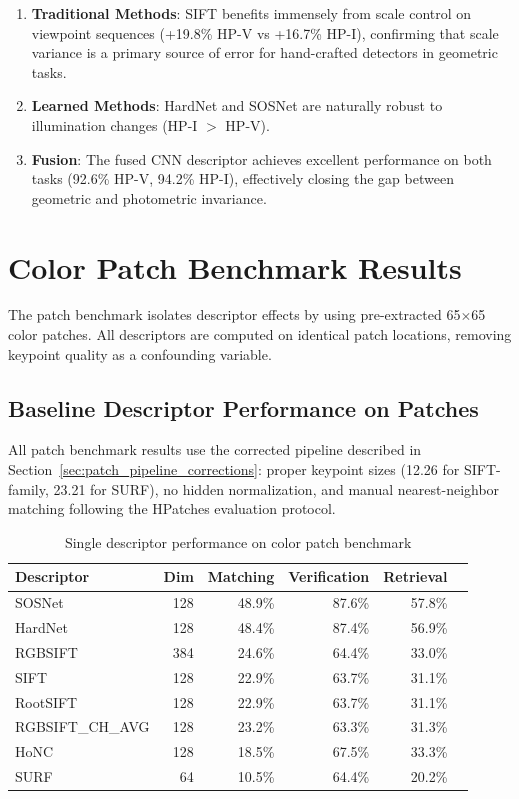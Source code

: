 \begin{enumerate}
    \item \textbf{Traditional Methods}: SIFT benefits immensely from scale control on viewpoint sequences (+19.8\% HP-V vs +16.7\% HP-I), confirming that scale variance is a primary source of error for hand-crafted detectors in geometric tasks.
    \item \textbf{Learned Methods}: HardNet and SOSNet are naturally robust to illumination changes (HP-I $>$ HP-V).
    \item \textbf{Fusion}: The fused CNN descriptor achieves excellent performance on both tasks (92.6\% HP-V, 94.2\% HP-I), effectively closing the gap between geometric and photometric invariance.
\end{enumerate}

\section{Color Patch Benchmark Results}%
\label{sec:patch_results}

The patch benchmark isolates descriptor effects by using pre-extracted 65$\times$65 color patches. All descriptors are computed on identical patch locations, removing keypoint quality as a confounding variable.

\subsection{Baseline Descriptor Performance on Patches}

All patch benchmark results use the corrected pipeline described in Section~\ref{sec:patch_pipeline_corrections}: proper keypoint sizes (12.26 for SIFT-family, 23.21 for SURF), no hidden normalization, and manual nearest-neighbor matching following the HPatches evaluation protocol.

\begin{table}[ht]
\centering
\caption{Single descriptor performance on color patch benchmark}%
\label{tab:patch_baselines}
\begin{tabular}{lrrrrr}
\toprule
\textbf{Descriptor} & \textbf{Dim} & \textbf{Matching} & \textbf{Verification} & \textbf{Retrieval} \\
\midrule
SOSNet & 128 & 48.9\% & 87.6\% & 57.8\% \\
HardNet & 128 & 48.4\% & 87.4\% & 56.9\% \\
RGBSIFT & 384 & 24.6\% & 64.4\% & 33.0\% \\
SIFT & 128 & 22.9\% & 63.7\% & 31.1\% \\
RootSIFT & 128 & 22.9\% & 63.7\% & 31.1\% \\
RGBSIFT\_CH\_AVG & 128 & 23.2\% & 63.3\% & 31.3\% \\
HoNC & 128 & 18.5\% & 67.5\% & 33.3\% \\
SURF & 64 & 10.5\% & 64.4\% & 20.2\% \\
\bottomrule
\end{tabular}
\end{table}

